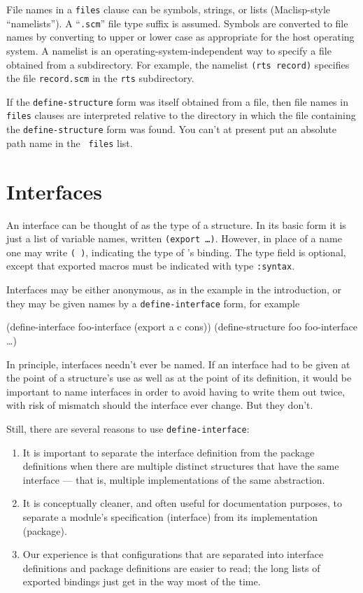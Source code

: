 File names in a {\tt files} clause can be symbols, strings, or lists
(Maclisp-style ``namelists'').  A ``{\tt.scm}'' file type suffix is
assumed.  Symbols are converted to file names by converting to upper
or lower case as appropriate for the host operating system.  A
namelist is an operating-system-independent way to specify a file
obtained from a subdirectory.  For example, the namelist {\tt(rts
record)} specifies the file {\tt record.scm} in the {\tt rts}
subdirectory.

If the {\tt define-structure} form was itself obtained from a file,
then file names in {\tt files} clauses are interpreted relative to the
directory in which the file containing the {\tt define-structure} form
was found.  You can't at present put an absolute path name in the {\tt
files} list.


\section{Interfaces}

An interface can be thought of as the type of a structure.  In its
basic form it is just a list of variable names, written {\tt(export
 \ldots)}.  However, in place of
a name one may write {\tt ( )}, indicating the type
of 's binding.
The type field is optional, except
 that exported macros must be indicated with type {\tt :syntax}.

Interfaces may be either anonymous, as in the example in the
introduction, or they may be given names by a {\tt define-interface}
form, for example
\begin{example}
(define-interface foo-interface (export a c cons))
(define-structure foo foo-interface \ldots)
\end{example}
In principle, interfaces needn't ever be named.  If an interface
had to be given at the point of a structure's use as well as at the
point of its definition, it would be important to name interfaces in
order to avoid having to write them out twice, with risk of mismatch
should the interface ever change.  But they don't.

Still, there are several reasons to use {\tt define-interface}:
\begin{enumerate}
\item It is important to separate the interface definition from the
package definitions when there are multiple distinct structures that
have the same interface --- that is, multiple implementations of the
same abstraction.

\item It is conceptually cleaner, and often useful for documentation
purposes, to separate a module's specification (interface) from its
implementation (package).

\item Our experience is that configurations that are separated into
interface definitions and package definitions are easier to read; the
long lists of exported bindings just get in the way most of the time.
\end{enumerate}

